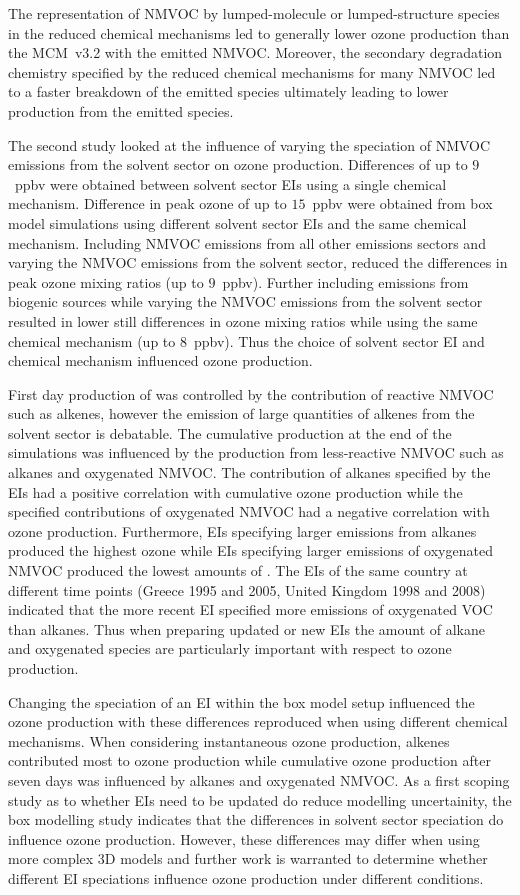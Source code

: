 The representation of NMVOC by lumped-molecule or lumped-structure species in the reduced chemical mechanisms led to generally lower ozone production than the MCM~v3.2 with the emitted NMVOC.
Moreover, the secondary degradation chemistry specified by the reduced chemical mechanisms for many NMVOC led to a faster breakdown of the emitted species ultimately leading to lower  production from the emitted species.

The second study looked at the influence of varying the speciation of NMVOC emissions from the solvent sector on ozone production.
Differences of up to $9$~ppbv were obtained between solvent sector EIs using a single chemical mechanism.
Difference in peak ozone of up to $15$~ppbv were obtained from box model simulations using different solvent sector EIs and the same chemical mechanism.
Including NMVOC emissions from all other emissions sectors and varying the NMVOC emissions from the solvent sector, reduced the differences in peak ozone mixing ratios (up to $9$~ppbv).
Further including emissions from biogenic sources while varying the NMVOC emissions from the solvent sector resulted in lower still differences in ozone mixing ratios while using the same chemical mechanism (up to $8$~ppbv).
Thus the choice of solvent sector EI and chemical mechanism influenced ozone production.

First day production of  was controlled by the contribution of reactive NMVOC such as alkenes, however the emission of large quantities of alkenes from the solvent sector is debatable.
The cumulative  production at the end of the simulations was influenced by the  production from less-reactive NMVOC such as alkanes and oxygenated NMVOC.
The contribution of alkanes specified by the EIs had a positive correlation with cumulative ozone production while the specified contributions of oxygenated NMVOC had a negative correlation with ozone production.
Furthermore, EIs specifying larger emissions from alkanes produced the highest ozone while EIs specifying larger emissions of oxygenated NMVOC produced the lowest amounts of .
The EIs of the same country at different time points (Greece 1995 and 2005, United Kingdom 1998 and 2008) indicated that the more recent EI specified more emissions of oxygenated VOC than alkanes.
Thus when preparing updated or new EIs the amount of alkane and oxygenated species are particularly important with respect to ozone production.

Changing the speciation of an EI within the box model setup influenced the ozone production with these differences reproduced when using different chemical mechanisms.
When considering instantaneous ozone production, alkenes contributed most to ozone production while cumulative ozone production after seven days was influenced by alkanes and oxygenated NMVOC.
As a first scoping study as to whether EIs need to be updated do reduce modelling uncertainity, the box modelling study indicates that the differences in solvent sector speciation do influence ozone production.
However, these differences may differ when using more complex 3D models and further work is warranted to determine whether different EI speciations influence ozone production under different conditions.

